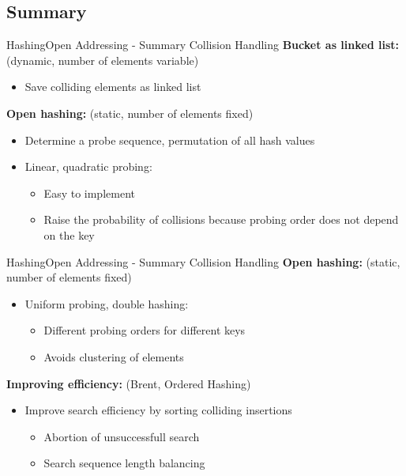 
\subsection{Summary}

\begin{frame}{Hashing}{Open Addressing - Summary Collision Handling}
  \textbf{Bucket as linked list:}
  {\color{Mittel-Blau}(dynamic, number of elements variable)}
  \begin{itemize}
    \item
      Save colliding elements as linked list
  \end{itemize}
  \vspace{1.0em}
  \textbf{Open hashing:}
  {\color{Mittel-Blau}(static, number of elements fixed)}
  \begin{itemize}
    \item
      Determine a probe sequence, permutation of all hash values
    \item
      Linear, quadratic probing:
      \begin{itemize}
        \item
          Easy to implement
        \item
          Raise the probability of collisions because probing order does
          not depend on the key
      \end{itemize}
  \end{itemize}
\end{frame}


\begin{frame}{Hashing}{Open Addressing - Summary Collision Handling}
  \textbf{Open hashing:}
         {\color{Mittel-Blau}(static, number of elements fixed)}
  \begin{itemize}
    \item
      Uniform probing, double hashing:
      \begin{itemize}
        \item
          Different probing orders for different keys
        \item
          Avoids clustering of elements
      \end{itemize}
  \end{itemize}
  \vspace{1.0em}
  \textbf{Improving efficiency:}
  {\color{Mittel-Blau}(Brent, Ordered Hashing)}
  \begin{itemize}
    \item
      Improve search efficiency by sorting colliding insertions
      \begin{itemize}
        \item
          Abortion of unsuccessfull search
        \item
          Search sequence length balancing
      \end{itemize}
  \end{itemize}
\end{frame}

